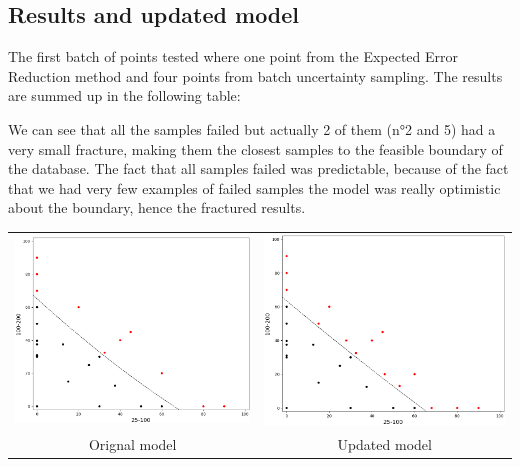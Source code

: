 \documentclass[10pt]{article}
\newenvironment{Figure}
  {\par\medskip\noindent\minipage{\linewidth}}
  {\endminipage\par\medskip}
\begin{document}
\begin{multicols}{2}
\subsection{Results and updated model}


The first batch of points tested where one point from the Expected Error Reduction method and four points from batch uncertainty sampling. The results are summed up in the following table:

\begin{minipage}[t]{\columnwidth}
\end{minipage}

We can see that all the samples failed but actually 2 of them (n°2 and 5) had a very small fracture, making them the closest samples to the feasible boundary of the database.
The fact that all samples failed was predictable, because of the fact that we had very few examples of failed samples the model was really optimistic about the boundary, hence the fractured results.

\begin{Figure}
  \begin{tabular}{cc}
    \includegraphics[width=0.45\columnwidth]{original_model.png} &   \includegraphics[width=0.45\columnwidth]{updated_model.png} \\
    Orignal model & Updated model \\[6pt]
  \end{tabular}
\end{Figure}


\end{multicols}
\end{document}
